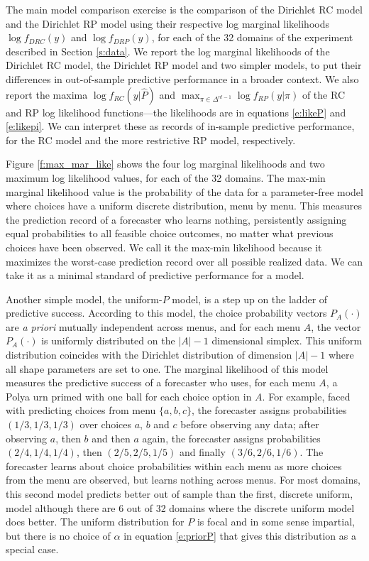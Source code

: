 \documentclass[11pt,letter]{article}
\newcommand{\Dpi}{Dirichlet RP model}
\newcommand{\DP}{Dirichlet RC model}
\begin{document}
The main model comparison exercise is the comparison of the \DP{} and the \Dpi{} using their respective log marginal likelihoods $\log f_{DRC}(y)$ and $\log f_{DRP}(y)$, for each of the 32 domains of the experiment described in Section \ref{s:data}.
We report the log marginal likelihoods of the \DP{}, the \Dpi{} and two simpler models, to put their differences in out-of-sample predictive performance in a broader context.
We also report the maxima $\log f_{RC}(y|\hat{P})$ and $\max_{\pi \in \Delta^{n!-1}} \log f_{RP}(y|\pi)$ of the RC and RP log likelihood functions---the likelihoods are in equations \eqref{e:likeP} and \eqref{e:likepi}.
We can interpret these as records of in-sample predictive performance, for the RC model and the more restrictive RP model, respectively.

Figure \ref{f:max_mar_like} shows the four log marginal likelihoods and two maximum log likelihood values, for each of the 32 domains.
The max-min marginal likelihood value is the probability of the data for a parameter-free model where choices have a uniform discrete distribution, menu by menu.
This measures the prediction record of a forecaster who learns nothing, persistently assigning equal probabilities to all feasible choice outcomes, no matter what previous choices have been observed.
We call it the max-min likelihood because it maximizes the worst-case prediction record over all possible realized data.
We can take it as a minimal standard of predictive performance for a model.

Another simple model, the uniform-$P$ model, is a step up on the ladder of predictive success.
According to this model, the choice probability vectors $P_A(\cdot)$ are {\em a priori} mutually independent across menus, and for each menu $A$, the vector $P_A(\cdot)$ is uniformly distributed on the $|A|-1$ dimensional simplex.
This uniform distribution coincides with the Dirichlet distribution of dimension $|A|-1$ where all shape parameters are set to  one.
The marginal likelihood of this model measures the predictive success of a forecaster who uses, for each menu $A$, a Polya urn primed with one ball for each choice option in $A$.
For example, faced with predicting choices from menu $\{a,b,c\}$, the forecaster assigns probabilities $(1/3, 1/3, 1/3)$ over choices $a$, $b$ and $c$ before observing any data; after observing $a$, then $b$ and then $a$ again, the forecaster assigns probabilities $(2/4, 1/4, 1/4)$, then $(2/5, 2/5, 1/5)$ and finally $(3/6, 2/6, 1/6)$.
The forecaster learns about choice probabilities within each menu as more choices from the menu are observed, but learns nothing across menus.
For most domains, this second model predicts better out of sample than the first, discrete uniform, model although there are 6 out of 32 domains where the discrete uniform model does better.
The uniform distribution for $P$ is focal and in some sense impartial, but there is no choice of $\alpha$ in equation \eqref{e:priorP} that gives this distribution as a special case.
\end{document}
